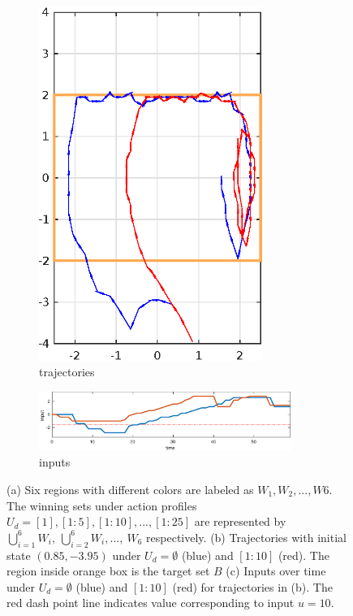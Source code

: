 \begin{figure}
\begin{subfigure}[b]{0.235\textwidth}
		\includegraphics[width=0.8\textwidth]{pic/traj}
		\caption{trajectories}
		\label{fig:traj}
	\end{subfigure}
	\begin{subfigure}[b]{0.5\textwidth}
		
		\includegraphics[width=0.9\textwidth]{pic/input}
		\caption{inputs}
		\label{fig:input}
	\end{subfigure}
	\caption{(a) Six regions with different colors are labeled as $ W_1,W_2,...,W6 $. The winning sets under action profiles $U_d = [1], [1:5],[1:10],...,[1:25]$ are represented by $ \bigcup_{i=1}^6 W_i,\ \bigcup_{i=2}^6 W_i,...,\ W_6 $ respectively. (b) Trajectories with initial state $ (0.85,-3.95) $ under $ U_d = \emptyset $ (blue) and $[1:10] $ (red). The region inside orange box is the target set $ B $ (c) Inputs over time under $ U_d = \emptyset $ (blue) and $ [1:10] $ (red) for trajectories in (b). The red dash point line indicates value corresponding to input $ u = 10 $.} %
\end{figure}

